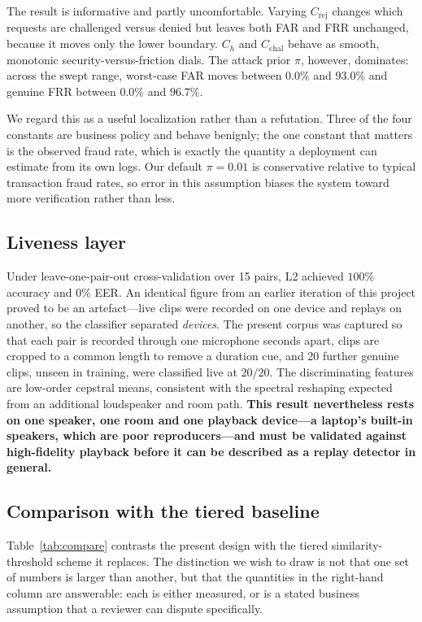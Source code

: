 \documentclass[conference]{IEEEtran}
\begin{document}
The result is informative and partly uncomfortable. Varying $C_{\text{rej}}$
changes which requests are challenged versus denied but leaves both FAR and FRR
unchanged, because it moves only the lower boundary. $C_h$ and
$C_{\text{chal}}$ behave as smooth, monotonic security-versus-friction dials.
The attack prior $\pi$, however, dominates: across the swept range, worst-case
FAR moves between $0.0\%$ and $93.0\%$ and genuine FRR between $0.0\%$ and
$96.7\%$.

We regard this as a useful localization rather than a refutation. Three of the
four constants are business policy and behave benignly; the one constant that
matters is the observed fraud rate, which is exactly the quantity a deployment
can estimate from its own logs. Our default $\pi=0.01$ is conservative relative
to typical transaction fraud rates, so error in this assumption biases the
system toward more verification rather than less.

\subsection{Liveness layer}

Under leave-one-pair-out cross-validation over 15 pairs, L2 achieved $100\%$
accuracy and $0\%$ EER. An identical figure from an earlier iteration of this
project proved to be an artefact---live clips were recorded on one device and
replays on another, so the classifier separated \emph{devices}. The present
corpus was captured so that each pair is recorded through one microphone
seconds apart, clips are cropped to a common length to remove a duration cue,
and 20 further genuine clips, unseen in training, were classified live at
$20/20$. The discriminating features are low-order cepstral means, consistent
with the spectral reshaping expected from an additional loudspeaker and room
path. \textbf{This result nevertheless rests on one speaker, one room and one
playback device---a laptop's built-in speakers, which are poor reproducers---and
must be validated against high-fidelity playback before it can be described as
a replay detector in general.}

\subsection{Comparison with the tiered baseline}

Table~\ref{tab:compare} contrasts the present design with the tiered
similarity-threshold scheme it replaces. The distinction we wish to draw is not
that one set of numbers is larger than another, but that the quantities in the
right-hand column are answerable: each is either measured, or is a stated
business assumption that a reviewer can dispute specifically.
\end{document}
